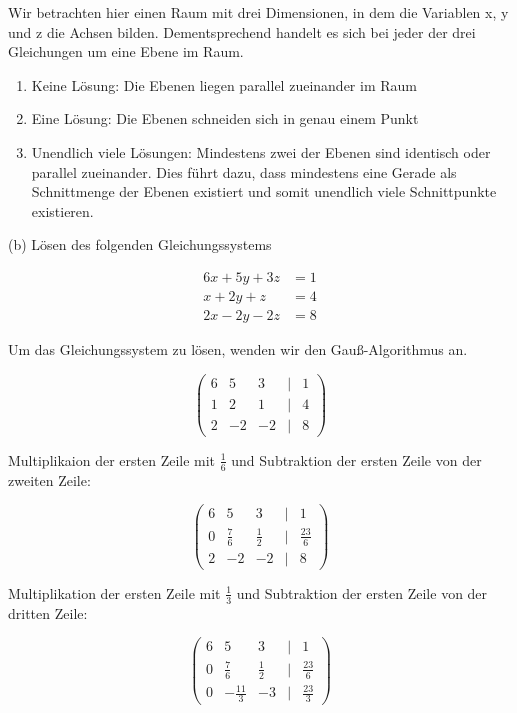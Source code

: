\documentclass[11pt]{article}
\begin{document}
    Wir betrachten hier einen Raum mit drei Dimensionen, in dem die Variablen x, y und z die Achsen bilden.
    Dementsprechend handelt es sich bei jeder der drei Gleichungen um eine Ebene im Raum.

    \begin{enumerate}
        \item  Keine Lösung: Die Ebenen liegen parallel zueinander im Raum
        \item  Eine Lösung: Die Ebenen schneiden sich in genau einem Punkt
        \item  Unendlich viele Lösungen: Mindestens zwei der Ebenen sind identisch oder parallel zueinander. Dies führt dazu, dass mindestens eine Gerade als Schnittmenge der Ebenen existiert und somit unendlich viele Schnittpunkte existieren.
    \end{enumerate}
    \bigskip

    (b) Lösen des folgenden Gleichungssystems

    \[
    \begin{aligned}
        6x + 5y + 3z & = 1 \\
        x + 2y + z & = 4 \\
        2x - 2y - 2z & = 8
    \end{aligned}
    \]
    \bigskip

    Um das Gleichungssystem zu lösen, wenden wir den Gauß-Algorithmus an.

    \[
    \begin{pmatrix}
        6 & 5 & 3 & | & 1 \\
        1 & 2 & 1 & | & 4 \\
        2 & -2 & -2 & | & 8
    \end{pmatrix}
    \]

    Multiplikaion der ersten Zeile mit $\frac{1}{6}$ und Subtraktion der ersten Zeile von der zweiten Zeile:

    \[
    \begin{pmatrix}
        6 & 5 & 3 & | & 1 \\
        0 & \frac{7}{6} & \frac{1}{2} & | & \frac{23}{6} \\
        2 & -2 & -2 & | & 8
    \end{pmatrix}
    \]

    Multiplikation der ersten Zeile mit $\frac{1}{3}$ und Subtraktion der ersten Zeile von der dritten Zeile:

    \[
    \begin{pmatrix}
        6 & 5 & 3 & | & 1 \\
        0 & \frac{7}{6} & \frac{1}{2} & | & \frac{23}{6} \\
        0 & -\frac{11}{3} & -3 & | & \frac{23}{3}
    \end{pmatrix}
    \]
\end{document}

